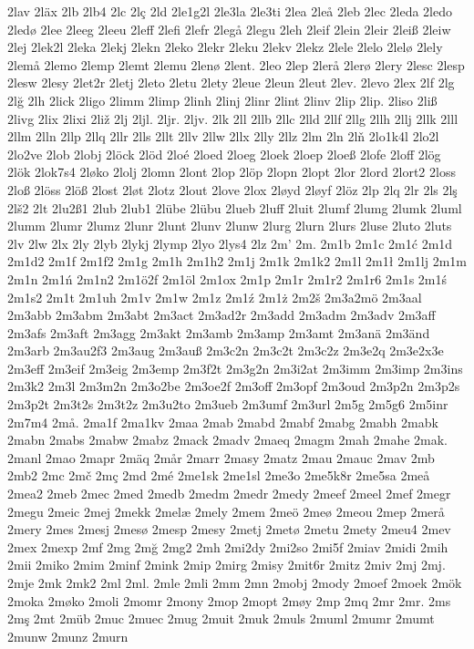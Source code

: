 2lav
2läx
2lb
2lb4
2lc
2lç
2ld
2le1g2l
2le3la
2le3ti
2lea
2leå
2leb
2lec
2leda
2ledo
2ledø
2lee
2leeg
2leeu
2leff
2lefi
2lefr
2legå
2legu
2leh
2leif
2lein
2leir
2leiß
2leiw
2lej
2lek2l
2leka
2lekj
2lekn
2leko
2lekr
2leku
2lekv
2lekz
2lele
2lelo
2lelø
2lely
2lemå
2lemo
2lemp
2lemt
2lemu
2lenø
2lent.
2leo
2lep
2lerå
2lerø
2lery
2lesc
2lesp
2lesw
2lesy
2let2r
2letj
2leto
2letu
2lety
2leue
2leun
2leut
2lev.
2levo
2lex
2lf
2lg
2lğ
2lh
2lick
2ligo
2limm
2limp
2linh
2linj
2linr
2lint
2linv
2lip
2lip.
2liso
2liß
2livg
2lix
2lixi
2liž
2lj
2ljl.
2ljr.
2ljv.
2lk
2ll
2llb
2llc
2lld
2llf
2llg
2llh
2llj
2llk
2lll
2llm
2lln
2llp
2llq
2llr
2lls
2llt
2llv
2llw
2llx
2lly
2llz
2lm
2ln
2lň
2lo1k4l
2lo2l
2lo2ve
2lob
2lobj
2löck
2löd
2loé
2loed
2loeg
2loek
2loep
2loeß
2lofe
2loff
2lög
2lök
2lok7s4
2løko
2lolj
2lomn
2lont
2lop
2löp
2lopn
2lopt
2lor
2lord
2lort2
2loss
2loß
2löss
2löß
2lost
2løt
2lotz
2lout
2love
2lox
2løyd
2løyf
2löz
2lp
2lq
2lr
2ls
2lş
2lš2
2lt
2lu2ß1
2lub
2lub1
2lübe
2lübu
2lueb
2luff
2luit
2lumf
2lumg
2lumk
2luml
2lumm
2lumr
2lumz
2lunr
2lunt
2lunv
2lunw
2lurg
2lurn
2lurs
2luse
2luto
2luts
2lv
2lw
2lx
2ly
2lyb
2lykj
2lymp
2lyo
2lys4
2lz
2m'
2m.
2m1b
2m1c
2m1ć
2m1d
2m1d2
2m1f
2m1f2
2m1g
2m1h
2m1h2
2m1j
2m1k
2m1k2
2m1l
2m1ł
2m1lj
2m1m
2m1n
2m1ń
2m1n2
2m1ö2f
2m1öl
2m1ox
2m1p
2m1r
2m1r2
2m1r6
2m1s
2m1ś
2m1s2
2m1t
2m1uh
2m1v
2m1w
2m1z
2m1ź
2m1ż
2m2š
2m3a2mö
2m3aal
2m3abb
2m3abm
2m3abt
2m3act
2m3ad2r
2m3add
2m3adm
2m3adv
2m3aff
2m3afs
2m3aft
2m3agg
2m3akt
2m3amb
2m3amp
2m3amt
2m3anä
2m3änd
2m3arb
2m3au2f3
2m3aug
2m3auß
2m3c2n
2m3c2t
2m3c2z
2m3e2q
2m3e2x3e
2m3eff
2m3eif
2m3eig
2m3emp
2m3f2t
2m3g2n
2m3i2at
2m3imm
2m3imp
2m3ins
2m3k2
2m3l
2m3m2n
2m3o2be
2m3oe2f
2m3off
2m3opf
2m3oud
2m3p2n
2m3p2s
2m3p2t
2m3t2s
2m3t2z
2m3u2to
2m3ueb
2m3umf
2m3url
2m5g
2m5g6
2m5inr
2m7m4
2må.
2ma1f
2ma1kv
2maa
2mab
2mabd
2mabf
2mabg
2mabh
2mabk
2mabn
2mabs
2mabw
2mabz
2mack
2madv
2maeq
2magm
2mah
2mahe
2mak.
2manl
2mao
2mapr
2mäq
2mår
2marr
2masy
2matz
2mau
2mauc
2mav
2mb
2mb2
2mc
2mč
2mç
2md
2mé
2me1sk
2me1sl
2me3o
2me5k8r
2me5sa
2meå
2mea2
2meb
2mec
2med
2medb
2medm
2medr
2medy
2meef
2meel
2mef
2megr
2megu
2meic
2mej
2mekk
2melæ
2mely
2mem
2meö
2meø
2meou
2mep
2merå
2mery
2mes
2mesj
2mesø
2mesp
2mesy
2metj
2metø
2metu
2mety
2meu4
2mev
2mex
2mexp
2mf
2mg
2mğ
2mg2
2mh
2mi2dy
2mi2so
2mi5f
2miav
2midi
2mih
2mii
2miko
2mim
2minf
2mink
2mip
2mirg
2misy
2mit6r
2mitz
2miv
2mj
2mj.
2mje
2mk
2mk2
2ml
2ml.
2mle
2mli
2mm
2mn
2mobj
2mody
2moef
2moek
2mök
2moka
2møko
2moli
2momr
2mony
2mop
2mopt
2møy
2mp
2mq
2mr
2mr.
2ms
2mş
2mt
2müb
2muc
2muec
2mug
2muit
2muk
2muls
2muml
2mumr
2mumt
2munw
2munz
2murn
